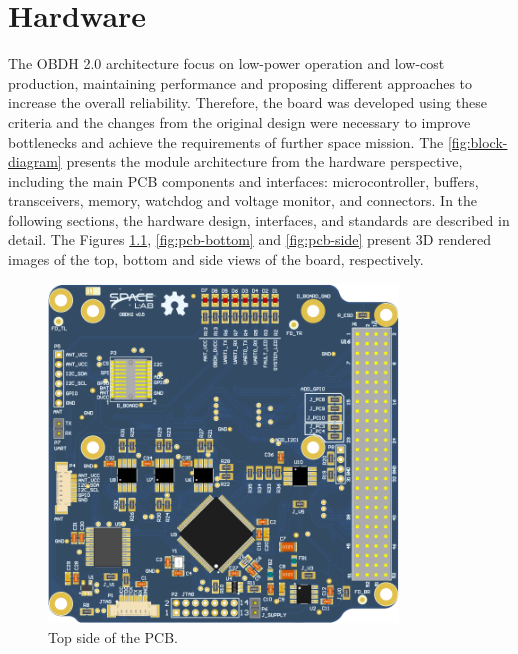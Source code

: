 %
%
%
%
%

%
%
%
%
%
%

\chapter{Hardware} \label{ch:hardware}

The OBDH 2.0 architecture focus on low-power operation and low-cost production, maintaining performance and proposing different approaches to increase the overall reliability. Therefore, the board was developed using these criteria and the changes from the original design were necessary to improve bottlenecks and achieve the requirements of further space mission. The \autoref{fig:block-diagram} presents the module architecture from the hardware perspective, including the main PCB components and interfaces: microcontroller, buffers, transceivers, memory, watchdog and voltage monitor, and connectors. In the following sections, the hardware design, interfaces, and standards are described in detail. The Figures \ref{fig:pcb-top}, \ref{fig:pcb-bottom} and \ref{fig:pcb-side} present 3D rendered images of the top, bottom and side views of the board, respectively.

\begin{figure}[!ht]
    \begin{center}
        \includegraphics[width=93mm]{figures/obdh2-pcb-top.png}
        \caption{Top side of the PCB.}
        \label{fig:pcb-top}
    \end{center}
\end{figure}

